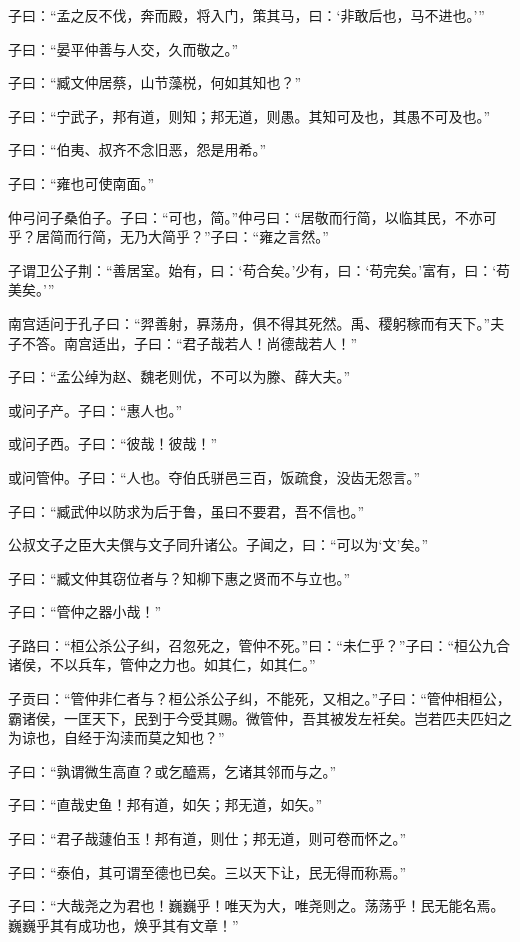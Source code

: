 \documentclass[a5paper]{ctexbook}
\begin{document}
    子曰：“孟之反不伐，奔而殿，将入门，策其马，曰：‘非敢后也，马不进也。’”

    子曰：“晏平仲善与人交，久而敬之。”

    子曰：“臧文仲居蔡，山节藻棁，何如其知也？”

    子曰：“宁武子，邦有道，则知；邦无道，则愚。其知可及也，其愚不可及也。”

    子曰：“伯夷、叔齐不念旧恶，怨是用希。”

    子曰：“雍也可使南面。”

    仲弓问子桑伯子。子曰：“可也，简。”仲弓曰：“居敬而行简，以临其民，不亦可乎？居简而行简，无乃大简乎？”子曰：“雍之言然。”

    子谓卫公子荆：“善居室。始有，曰：‘苟合矣。’少有，曰：‘苟完矣。’富有，曰：‘苟美矣。’”

    南宫适问于孔子曰：“羿善射，奡荡舟，俱不得其死然。禹、稷躬稼而有天下。”夫子不答。南宫适出，子曰：“君子哉若人！尚德哉若人！”

    子曰：“孟公绰为赵、魏老则优，不可以为滕、薛大夫。”

    或问子产。子曰：“惠人也。”
    
    或问子西。子曰：“彼哉！彼哉！”

    或问管仲。子曰：“人也。夺伯氏骈邑三百，饭疏食，没齿无怨言。”

    子曰：“臧武仲以防求为后于鲁，虽曰不要君，吾不信也。”

    公叔文子之臣大夫僎与文子同升诸公。子闻之，曰：“可以为‘文’矣。”

    子曰：“臧文仲其窃位者与？知柳下惠之贤而不与立也。”

    子曰：“管仲之器小哉！”

    子路曰：“桓公杀公子纠，召忽死之，管仲不死。”曰：“未仁乎？”子曰：“桓公九合诸侯，不以兵车，管仲之力也。如其仁，如其仁。”

    子贡曰：“管仲非仁者与？桓公杀公子纠，不能死，又相之。”子曰：“管仲相桓公，霸诸侯，一匡天下，民到于今受其赐。微管仲，吾其被发左衽矣。岂若匹夫匹妇之为谅也，自经于沟渎而莫之知也？”

    子曰：“孰谓微生高直？或乞醯焉，乞诸其邻而与之。”

    子曰：“直哉史鱼！邦有道，如矢；邦无道，如矢。”

    子曰：“君子哉蘧伯玉！邦有道，则仕；邦无道，则可卷而怀之。”

    子曰：“泰伯，其可谓至德也已矣。三以天下让，民无得而称焉。”

    子曰：“大哉尧之为君也！巍巍乎！唯天为大，唯尧则之。荡荡乎！民无能名焉。巍巍乎其有成功也，焕乎其有文章！”
\end{document}
